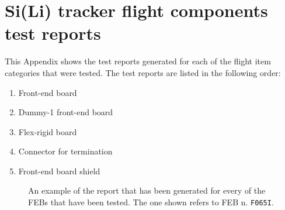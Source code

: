 \chapter[Si(Li) tracker flight components test reports]{Si(Li) tracker flight components\\test reports} \label{appendixREPORTS}

This Appendix shows the test reports generated for each of the flight item categories that were tested. The test reports are listed in the following order:

\begin{enumerate}
    \itemsep0em
    \item Front-end board
    \item Dummy-1 front-end board
    \item Flex-rigid board
    \item Connector for termination
    \item Front-end board shield
\end{enumerate}

\begin{figure}[ht]
    \centering
    \caption{An example of the report that has been generated for every of the FEBs that have been tested. The one shown refers to FEB n. \texttt{F065I}.}
    \label{figF065I}
\end{figure}

